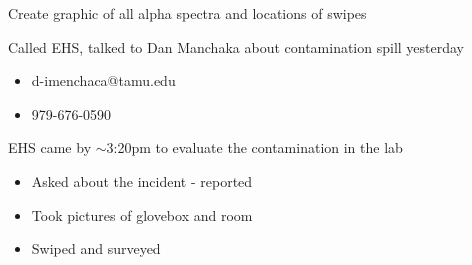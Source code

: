 \documentclass[idxtotoc,hyperref,openany,oneside]{labbook} %
\newcommand{\cmark}{\ding{51}}%
\newcommand{\done}{\rlap{$\square$}{\raisebox{2pt}{\large\hspace{1pt}\cmark}}%
  \hspace{-2.5pt}}
\begin{document}
\begin{todolist}
\item[\done]{Create graphic of all alpha spectra and locations of swipes}
\item[\done]{Called EHS, talked to Dan Manchaka about contamination
  spill yesterday}
  \begin{itemize}
  \item{d-imenchaca@tamu.edu}
  \item{979-676-0590}
  \end{itemize}
\item[\done]{EHS came by $\sim$3:20pm to evaluate the contamination
  in the lab}
  \begin{itemize}
  \item{Asked about the incident - reported}
  \item{Took pictures of glovebox and room}
  \item{Swiped and surveyed}
  \end{itemize}
\end{todolist}
\end{document}
